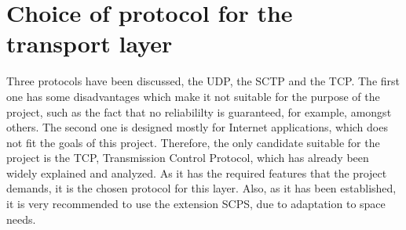 \documentclass[12pt,a4paper]{report}
\begin{document}
\section{Choice of protocol for the transport layer}
Three protocols have been discussed, the UDP, the SCTP and the TCP. The first one has some disadvantages which make it not suitable for the purpose of the project, such as the fact that no reliabililty is guaranteed, for example, amongst others. The second one is designed mostly for Internet applications, which does not fit the goals of this project. Therefore, the only candidate suitable for the project is the TCP, Transmission Control Protocol, which has already been widely explained and analyzed. As it has the required features that the project demands, it is the chosen protocol for this layer. Also, as it has been established, it is very recommended to use the extension SCPS, due to adaptation to space needs.  
\end{document}

